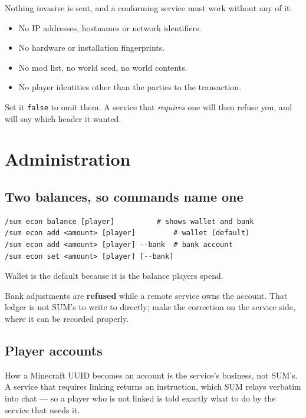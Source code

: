 \documentclass[11pt,a4paper]{article}
\newcommand{\code}[1]{\texttt{\small #1}}
\newcommand{\keybox}[2]{%
  \par\vspace{0.5em}\noindent
  \colorbox{#1}{\begin{minipage}{\dimexpr\linewidth-2\fboxsep\relax}
  \vspace{0.35em}\small #2\vspace{0.35em}\end{minipage}}\par\vspace{0.5em}}
\newcommand{\warn}[1]{\keybox{omceWarnWash}{#1}}
\begin{document}
Nothing invasive is sent, and a conforming service must work without any of it:

\begin{itemize}
\item No IP addresses, hostnames or network identifiers.
\item No hardware or installation fingerprints.
\item No mod list, no world seed, no world contents.
\item No player identities other than the parties to the transaction.
\end{itemize}

Set it \code{false} to omit them. A service that \emph{requires} one will then refuse you, and will
say which header it wanted.

\section{Administration}

\subsection{Two balances, so commands name one}

\begin{lstlisting}
/sum econ balance [player]          # shows wallet and bank
/sum econ add <amount> [player]         # wallet (default)
/sum econ add <amount> [player] --bank  # bank account
/sum econ set <amount> [player] [--bank]
\end{lstlisting}

Wallet is the default because it is the balance players spend.

\warn{Bank adjustments are \textbf{refused} while a remote service owns the account. That ledger
is not SUM's to write to directly; make the correction on the service side, where it can be
recorded properly.}

\subsection{Player accounts}

How a Minecraft UUID becomes an account is the service's business, not SUM's. A service that
requires linking returns an instruction, which SUM relays verbatim into chat --- so a player who
is not linked is told exactly what to do by the service that needs it.
\end{document}
